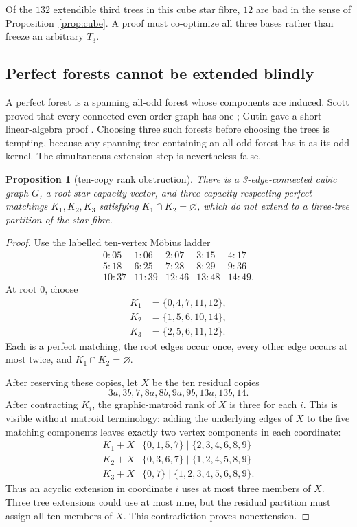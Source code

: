 \documentclass[11pt]{article}
\newtheorem{proposition}[theorem]{Proposition}
\theoremstyle{definition}
\theoremstyle{remark}
\newcommand{\1}{\mathbf 1}
\begin{document}
Of the \(132\) extendible third trees in this cube star fibre, \(12\) are
bad in the sense of Proposition~\ref{prop:cube}.  A proof must co-optimize
all three bases rather than freeze an arbitrary \(T_3\).

\subsection{Perfect forests cannot be extended blindly}

A perfect forest is a spanning all-odd forest whose components are induced.
Scott proved that every connected even-order graph has one
\cite{Scott2001}; Gutin gave a short linear-algebra proof
\cite{Gutin2016}.  Choosing three such forests before choosing the trees is
tempting, because any spanning tree containing an all-odd forest has it as
its odd kernel.  The simultaneous extension step is nevertheless false.

\begin{proposition}[ten-copy rank obstruction]\label{prop:perfect}
There is a 3-edge-connected cubic graph \(G\), a root-star capacity vector,
and three capacity-respecting perfect matchings \(K_1,K_2,K_3\) satisfying
\(K_1\cap K_2=\varnothing\), which do not extend to a three-tree partition
of the star fibre.
\end{proposition}

\begin{proof}
Use the labelled ten-vertex M\"obius ladder
\[
\begin{array}{lllll}
0:05&1:06&2:07&3:15&4:17\\
5:18&6:25&7:28&8:29&9:36\\
10:37&11:39&12:46&13:48&14:49.
\end{array}
\]
At root \(0\), choose
\[
\begin{aligned}
K_1&=\{0,4,7,11,12\},\\
K_2&=\{1,5,6,10,14\},\\
K_3&=\{2,5,6,11,12\}.
\end{aligned}                                            \tag{6.4}
\]
Each is a perfect matching, the root edges occur once, every other edge
occurs at most twice, and \(K_1\cap K_2=\varnothing\).

After reserving these copies, let \(X\) be the ten residual copies
\[
 3a,3b,7,8a,8b,9a,9b,13a,13b,14.                         \tag{6.5}
\]
After contracting \(K_i\), the graphic-matroid rank of \(X\) is three for
each \(i\).  This is visible without matroid terminology: adding the
underlying edges of \(X\) to the five matching components leaves exactly
two vertex components in each coordinate:
\[
\begin{array}{c|l}
K_1+X&\{0,1,5,7\}\mid\{2,3,4,6,8,9\}\\
K_2+X&\{0,3,6,7\}\mid\{1,2,4,5,8,9\}\\
K_3+X&\{0,7\}\mid\{1,2,3,4,5,6,8,9\}.
\end{array}
\]
Thus an acyclic extension in coordinate \(i\) uses at most three members
of \(X\).  Three tree extensions could use at most nine, but the residual
partition must assign all ten members of \(X\).  This contradiction proves
nonextension.
\end{proof}
\end{document}
